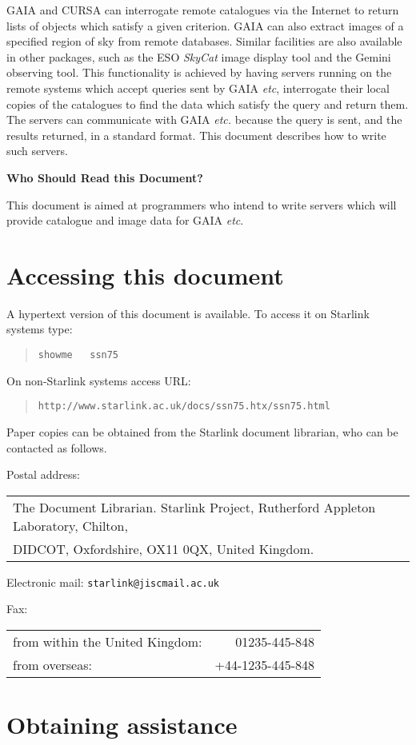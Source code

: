 \documentclass[twoside,11pt]{article}
\newcommand{\stardocabstract}
{GAIA and CURSA can interrogate remote catalogues via the Internet to
return lists of objects which satisfy a given criterion.  GAIA can also
extract images of a specified region of sky from remote databases.
Similar facilities are also available in other packages, such as the
ESO {\it SkyCat}\/ image display tool and the Gemini observing tool.
This functionality is achieved by having servers running on the remote
systems which accept queries sent by GAIA \emph{etc}, interrogate their
local copies of the catalogues to find the data which satisfy the query
and return them.  The servers can communicate with GAIA \emph{etc.} because
the query is sent, and the results returned, in a standard format.  This
document describes how to write such servers.

\begin{latexonly}
\vspace{5mm}
\end{latexonly}

\begin{center}
{\bf Who Should Read this Document?}
\end{center}

This document is aimed at programmers who intend to write servers which
will provide catalogue and image data for GAIA \emph{etc}.}
\newcommand{\htmladdnormallink}[2]{#1}
\newenvironment{latexonly}{}{}
\renewcommand{\_}{\texttt{\symbol{95}}}
\begin{document}
\stardocabstract

\newpage
\section*{Accessing this document}

A hypertext version of this document is available.  To access it on
Starlink systems type:

\begin{quote}
{\tt showme ~ ssn75}
\end{quote}

On non-Starlink systems access URL:

\begin{quote}
\htmladdnormallink{
{\tt http://www.starlink.ac.uk/docs/ssn75.htx/ssn75.html}}
{http://www.starlink.ac.uk/docs/ssn75.htx/ssn75.html}
\end{quote}

Paper copies can be obtained from the Starlink document librarian,
who can be contacted as follows.

Postal address: \\
\begin{tabular}{l}
The Document Librarian. Starlink Project, Rutherford Appleton Laboratory,
  Chilton, \\
DIDCOT, Oxfordshire, OX11 0QX, United Kingdom.                \\
\end{tabular}


Electronic mail: {\tt starlink@jiscmail.ac.uk}


Fax: \\
\begin{tabular}{lr}
from within the United Kingdom: &    01235-445-848 \\
from overseas:                  & +44-1235-445-848 \\
\end{tabular}


\section*{Obtaining assistance}
\end{document}
